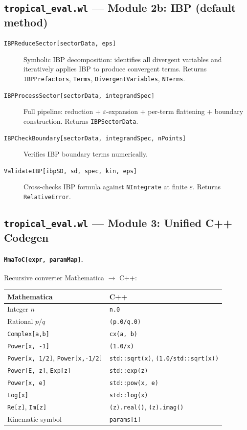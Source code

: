 \documentclass[11pt,a4paper]{article}
\begin{document}
\subsection{\texttt{tropical\_eval.wl} --- Module 2b: IBP (default method)}

\begin{description}
  \item[\texttt{IBPReduceSector[sectorData, eps]}] Symbolic IBP decomposition: identifies all divergent variables and iteratively applies IBP to produce convergent terms. Returns \texttt{IBPPrefactors}, \texttt{Terms}, \texttt{DivergentVariables}, \texttt{NTerms}.
  \item[\texttt{IBPProcessSector[sectorData, integrandSpec]}] Full pipeline: reduction + $\varepsilon$-expansion + per-term flattening + boundary construction. Returns \texttt{IBPSectorData}.
  \item[\texttt{IBPCheckBoundary[sectorData, integrandSpec, nPoints]}] Verifies IBP boundary terms numerically.
  \item[\texttt{ValidateIBP[ibpSD, sd, spec, kin, eps]}] Cross-checks IBP formula against \texttt{NIntegrate} at finite $\varepsilon$. Returns \texttt{RelativeError}.
\end{description}

\subsection{\texttt{tropical\_eval.wl} --- Module 3: Unified C++ Codegen}

\paragraph{\texttt{MmaToC[expr, paramMap]}.} Recursive converter Mathematica $\to$ C++:
\begin{center}
\begin{tabular}{ll}
\toprule
\textbf{Mathematica} & \textbf{C++} \\
\midrule
Integer $n$ & \texttt{n.0} \\
Rational $p/q$ & \texttt{(p.0/q.0)} \\
\texttt{Complex[a,b]} & \texttt{cx(a, b)} \\
\texttt{Power[x, -1]} & \texttt{(1.0/x)} \\
\texttt{Power[x, 1/2]}, \texttt{Power[x,-1/2]} & \texttt{std::sqrt(x)}, \texttt{(1.0/std::sqrt(x))} \\
\texttt{Power[E, z]}, \texttt{Exp[z]} & \texttt{std::exp(z)} \\
\texttt{Power[x, e]} & \texttt{std::pow(x, e)} \\
\texttt{Log[x]} & \texttt{std::log(x)} \\
\texttt{Re[z]}, \texttt{Im[z]} & \texttt{(z).real()}, \texttt{(z).imag()} \\
Kinematic symbol & \texttt{params[i]} \\
\bottomrule
\end{tabular}
\end{center}
\end{document}

